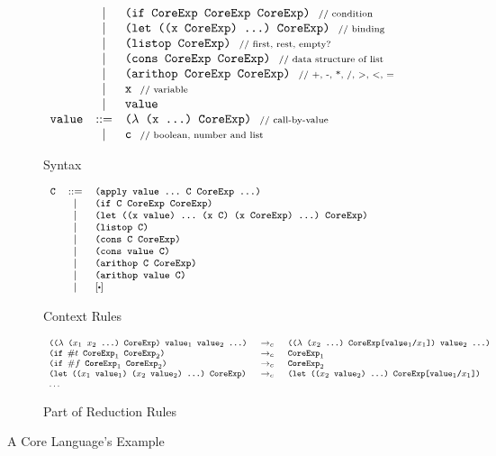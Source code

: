 \begin{figure*}[thb]
\begin{subfigure}{0.45\linewidth}
\[{\begin{array}{lcl}
		&|& \mbox{\tt (if~CoreExp~CoreExp~CoreExp)} ~~\mbox{{\scriptsize // condition}}\\
		&|& \mbox{\tt (let~((x~CoreExp)~...)~CoreExp)} ~~\mbox{{\scriptsize // binding}}\\
		&|& \mbox{\tt (listop~CoreExp)} ~~\mbox{{\scriptsize // first, rest, empty?}}\\
		&|& \mbox{\tt (cons~CoreExp~CoreExp)} ~~\mbox{{\scriptsize // data structure of list}}\\
		&|& \mbox{\tt (arithop~CoreExp~CoreExp)} ~~\mbox{{\scriptsize // +, -, *, /, >, <, =}}\\
		&|& \mbox{\tt x} ~~\mbox{{\scriptsize // variable}}\\
		&|& \mbox{\tt value}\\
		\mbox{\tt value} &::=& \mbox{\tt ($\lambda$~(x~...)~CoreExp)} ~~\mbox{{\scriptsize // call-by-value}}\\
		&|& \mbox{\tt c} ~~\mbox{{\scriptsize // boolean, number and list}}
		\end{array}
}
\]
\caption{Syntax}
\end{subfigure}
\begin{subfigure}{0.5\linewidth}
\[
{\footnotesize
		\begin{array}{lcl}	
		\Code{C} &::=& \Code{(apply~value~...~C~CoreExp~...)}\\
		&|& \Code{(if~C~CoreExp~CoreExp)}\\
		&|& \Code{(let~((x~value)~...~(x~C)~(x~CoreExp)~...)~CoreExp)}\\
		&|& \Code{(listop~C)}\\
		&|& \Code{(cons~C~CoreExp)}\\
		&|& \Code{(cons~value~C)}\\
		&|& \Code{(arithop~C~CoreExp)}\\
		&|& \Code{(arithop~value~C)}\\
		&|& [\bigcdot]
		\end{array}
}
\]
\caption{Context Rules}
\end{subfigure}

\begin{subfigure}{0.8\linewidth}
	\[
{\footnotesize
		\begin{array}{lcl}	
		\texttt{(($\lambda$~($x_1$~$x_2$~...)~CoreExp)~$\mbox{\tt value}_1$~$\mbox{\tt value}_2$~...)} &~\rightarrow_c~& \texttt{(($\lambda$~($x_2$~...)~CoreExp[$\mbox{\tt value}_1$/$x_1$])~$\mbox{\tt value}_2$~...)}\\

		\texttt{(if~$\#t$~$\mbox{\tt CoreExp}_1$~$\mbox{\tt CoreExp}_2$)}&~\rightarrow_c~& \texttt{$\mbox{\tt CoreExp}_1$}\\
		\texttt{(if~$\#f$~$\mbox{\tt CoreExp}_1$~$\mbox{\tt CoreExp}_2$)}&~\rightarrow_c~& \texttt{$\mbox{\tt CoreExp}_2$}\\
		\texttt{(let~(($x_1$~$\mbox{\tt value}_1$)~($x_2$~$\mbox{\tt value}_2$)~...)~CoreExp)}&~\rightarrow_c~&\texttt{(let~(($x_2$~$\mbox{\tt value}_2$)~...)~CoreExp[$\mbox{\tt value}_1$/$x_1$])}\\
		\ldots&&
		\end{array}
}
\]
	\caption{Part of Reduction Rules}
\end{subfigure}

\caption{A Core Language's Example}
\label{fig:core}
\end{figure*}



